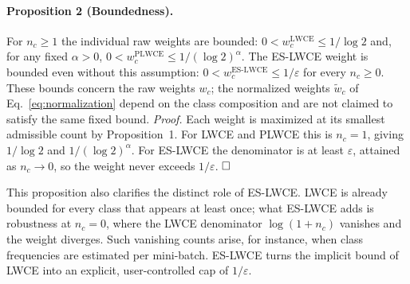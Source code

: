 \documentclass[a4paper,fleqn]{cas-sc}
\begin{document}
\paragraph{Proposition 2 (Boundedness).}
For $n_c \ge 1$ the individual raw weights are bounded:
$0 < w_c^{\mathrm{LWCE}} \le 1/\log 2$ and, for any fixed $\alpha > 0$,
$0 < w_c^{\mathrm{PLWCE}} \le 1/(\log 2)^{\alpha}$. The ES-LWCE weight is bounded
even without this assumption: $0 < w_c^{\mathrm{ES\text{-}LWCE}} \le 1/\varepsilon$
for every $n_c \ge 0$. These bounds concern the raw weights $w_c$; the normalized
weights $\widetilde{w}_c$ of Eq.~\eqref{eq:normalization} depend on the class
composition and are not claimed to satisfy the same fixed bound.
\emph{Proof.} Each weight is maximized at its smallest admissible count by
Proposition~1. For LWCE and PLWCE this is $n_c = 1$, giving $1/\log 2$ and
$1/(\log 2)^{\alpha}$. For ES-LWCE the denominator is at least $\varepsilon$,
attained as $n_c \to 0$, so the weight never exceeds $1/\varepsilon$.
$\hfill\square$

This proposition also clarifies the distinct role of ES-LWCE. LWCE is already
bounded for every class that appears at least once; what ES-LWCE adds is
robustness at $n_c = 0$, where the LWCE denominator $\log(1+n_c)$ vanishes and the
weight diverges. Such vanishing counts arise, for instance, when class frequencies
are estimated per mini-batch. ES-LWCE turns the implicit bound of LWCE into an
explicit, user-controlled cap of $1/\varepsilon$.
\end{document}

